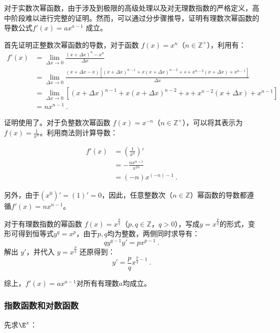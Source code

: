 对于实数次幂函数，由于涉及到极限的高级处理以及对无理数指数的严格定义，高中阶段难以进行完整的证明。然而，可以通过分步骤推导，证明有理数次幂函数的导数公式$f'(x) = ax^{a-1}$ 成立。

首先证明正整数次幂函数的导数，对于函数 $f(x) = x^n$（$n \in \mathbb{Z}^+$），利用有：
\begin{equation}
\begin{split}
f'(x) &= \lim_{\Delta x \to 0} \frac{(x+\Delta x)^n - x^n}{\Delta x}\\
&=\lim_{\Delta x \to 0} \frac{(x+\Delta x-x)[(x+\Delta x)^{n-1}+x(x+\Delta x)^{n-2}+s+x^{n-2}(x+\Delta x)+x^{n-1}]}{\Delta x}\\
&=\lim_{\Delta x \to 0} [(x+\Delta x)^{n-1}+x(x+\Delta x)^{n-2}+s+x^{n-2}(x+\Delta x)+x^{n-1}]\\
&=nx^{n-1}~.
\end{split}
\end{equation}

证明使用了。对于负整数次幂函数 $f(x) = x^{-n}$（$n \in \mathbb{Z}^+$），可以将其表示为 $f(x) = \frac{1}{x^{n}}$。利用商法则计算导数：

\begin{equation}
\begin{split}
f'(x) &= \left(\frac{1}{x^n}\right)' \\
&=-\frac{nx^{n-1}}{x^{2n}}\\
&=(-n)x^{(-n)-1}~.
\end{split}
\end{equation}

另外，由于$(x^0)'=(1)'=0$，因此，任意整数次（$n\in\mathbb{Z}$）幂函数的导数都遵循$f'(x) = nx^{n-1}$。

对于有理数指数的幂函数 $f(x) = x^{\frac{p}{q}}$（$p, q \in \mathbb{Z}$，$q > 0$），写成$y=x^{\frac{p}{q}}$的形式，变形可得到恒等式$y^q=x^p$，由于$p,q$均为整数，两侧同时求导有：
\begin{equation}
q  y^{q-1}  y' = p  x^{p-1}~.
\end{equation}
解出 $y'$，并代入 $\displaystyle y = x^{\frac{p}{q}}$ 还原得到：
\begin{equation}
y' =\frac{p}{q} x^{\frac{p}{q}-1}~.
\end{equation}

综上，$f'(x) = ax^{a-1}$对所有有理数$a$均成立。

\subsubsection{指数函数和对数函数}
先求$\E^x$：

